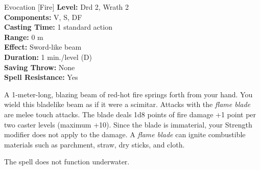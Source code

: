 {Evocation [Fire]}
{
	\textbf{Level:}
	Drd 2, Wrath 2\\
	\textbf{Components:}
	V, S, DF\\
	\textbf{Casting Time:}
	1 standard action\\
	\textbf{Range:}
	0 m\\
	\textbf{Effect:}
	Sword-like beam\\
	\textbf{Duration:}
	1 min./level (D)\\
	\textbf{Saving Throw:}
	None\\
	\textbf{Spell Resistance:}
	Yes\\
}
{
	A 1-meter-long, blazing beam of red-hot fire springs forth from your hand. You wield this bladelike beam as if it were a scimitar. Attacks with the \emph{flame blade} are melee touch attacks. The blade deals 1d8 points of fire damage +1 point per two caster levels (maximum +10). Since the blade is immaterial, your Strength modifier does not apply to the damage. A \emph{flame blade} can ignite combustible materials such as parchment, straw, dry sticks, and cloth.

	The spell does not function underwater.

}

